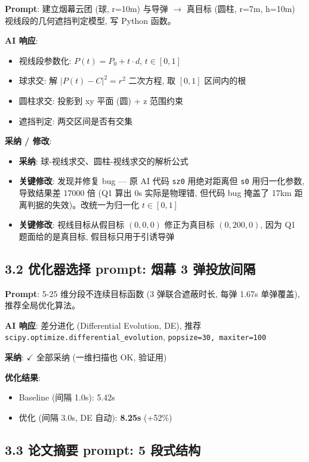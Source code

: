 \documentclass[electronic]{format}
\renewcommand{\textbf}[1]{{\song\bfseries #1}}
\begin{document}
\textbf{Prompt}: 建立烟幕云团 (球, r=10m) 与导弹 $\to$ 真目标 (圆柱, r=7m, h=10m) 视线段的几何遮挡判定模型, 写 Python 函数。

\textbf{AI 响应}:
\begin{itemize}
  \item 视线段参数化: $P(t) = P_0 + t \cdot d$, $t \in [0, 1]$
  \item 球求交: 解 $|P(t) - C|^2 = r^2$ 二次方程, 取 $[0,1]$ 区间内的根
  \item 圆柱求交: 投影到 xy 平面 (圆) + z 范围约束
  \item 遮挡判定: 两交区间是否有交集
\end{itemize}

\textbf{采纳 / 修改}:
\begin{itemize}
  \item \textbf{采纳}: 球-视线求交、圆柱-视线求交的解析公式
  \item \textbf{关键修改}: 发现并修复 bug --- 原 AI 代码 \texttt{sz0} 用绝对距离但 \texttt{s0} 用归一化参数, 导致结果差 17000 倍 (Q1 算出 0s 实际是物理错, 但代码 bug 掩盖了 17km 距离判据的失效)。改统一为归一化 $t \in [0,1]$
  \item \textbf{关键修改}: 视线目标从假目标 $(0,0,0)$ 修正为真目标 $(0,200,0)$, 因为 Q1 题面给的是真目标, 假目标只用于引诱导弹
\end{itemize}

\subsection{3.2 优化器选择 prompt: 烟幕 3 弹投放间隔}

\textbf{Prompt}: 5-25 维分段不连续目标函数 (3 弹联合遮蔽时长, 每弹 1.67s 单弹覆盖), 推荐全局优化算法。

\textbf{AI 响应}: 差分进化 (Differential Evolution, DE), 推荐 \texttt{scipy.optimize.differential\_evolution}, \texttt{popsize=30, maxiter=100}

\textbf{采纳}: $\checkmark$ 全部采纳 (一维扫描也 OK, 验证用)

\textbf{优化结果}:
\begin{itemize}
  \item Baseline (间隔 1.0s): 5.42s
  \item 优化 (间隔 3.0s, DE 自动): \textbf{8.25s} (+52\%)
\end{itemize}

\subsection{3.3 论文摘要 prompt: 5 段式结构}
\end{document}
